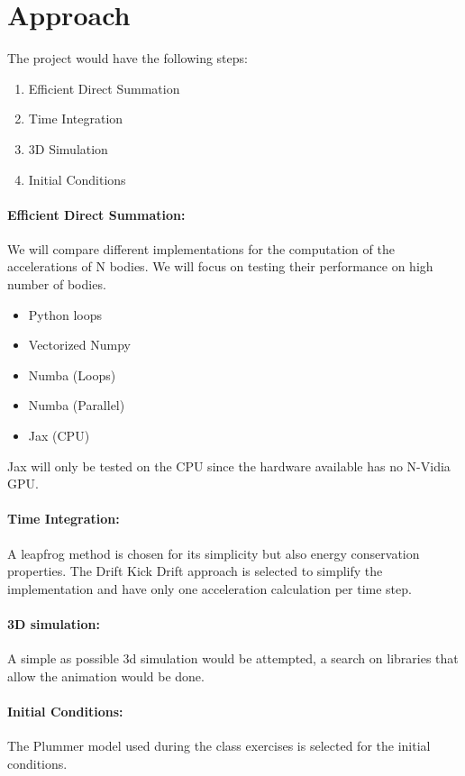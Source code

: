 \documentclass[a4paper, 11pt]{article}         %
\begin{document}
\section{Approach}                              %
The project would have the following steps:
\begin{enumerate}
    \item Efficient Direct Summation
    \item Time Integration
    \item 3D Simulation
    \item Initial Conditions
\end{enumerate}


\paragraph{Efficient Direct Summation:}
We will compare different implementations for the computation of the accelerations of N bodies.
We will focus on testing their performance on high number of bodies.

\begin{itemize}
    \item Python loops
    \item Vectorized Numpy
    \item Numba (Loops)
    \item Numba (Parallel)
    \item Jax (CPU)
\end{itemize}

Jax will only be tested on the CPU since the hardware available has no N-Vidia GPU.

\paragraph{Time Integration:}
A leapfrog method is chosen for its simplicity but also energy conservation properties.
The Drift Kick Drift approach is selected to simplify the implementation and have only one acceleration calculation per time step.


\paragraph{3D simulation:}
A simple as possible 3d simulation would be attempted, a search on libraries that allow the animation would be done.

\paragraph{Initial Conditions:}
The Plummer model used during the class exercises is selected for the initial conditions.
\end{document}
